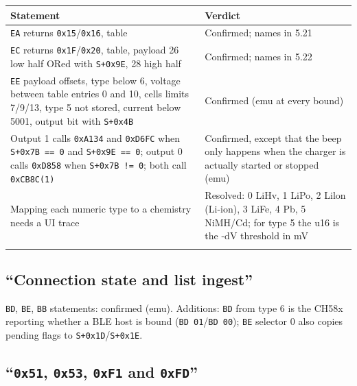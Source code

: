 {\def\LTcaptype{none} %
\begin{longtable}[]{@{}
  >{\raggedright\arraybackslash}p{}
  >{\raggedright\arraybackslash}p{}@{}}
\toprule\noalign{}
\begin{minipage}[b]{\linewidth}\raggedright
Statement
\end{minipage} & \begin{minipage}[b]{\linewidth}\raggedright
Verdict
\end{minipage} \\
\midrule\noalign{}
\endhead
\bottomrule\noalign{}
\endlastfoot
\texttt{EA} returns \texttt{0x15}/\texttt{0x16}, table & Confirmed;
names in 5.21 \\
\texttt{EC} returns \texttt{0x1F}/\texttt{0x20}, table, payload 26 low
half ORed with \texttt{S+0x9E}, 28 high half & Confirmed; names in
5.22 \\
\texttt{EE} payload offsets, type below 6, voltage between table entries
0 and 10, cells limits 7/9/13, type 5 not stored, current below 5001,
output bit with \texttt{S+0x4B} & Confirmed (emu at every bound) \\
Output 1 calls \texttt{0xA134} and \texttt{0xD6FC} when
\texttt{S+0x7B\ ==\ 0} and \texttt{S+0x9E\ ==\ 0}; output 0 calls
\texttt{0xD858} when \texttt{S+0x7B\ !=\ 0}; both call
\texttt{0xCB8C(1)} & Confirmed, except that the beep only happens when
the charger is actually started or stopped (emu) \\
Mapping each numeric type to a chemistry needs a UI trace & Resolved: 0
LiHv, 1 LiPo, 2 Lilon (Li-ion), 3 LiFe, 4 Pb, 5 NiMH/Cd; for type 5 the
u16 is the -dV threshold in mV \\*
\end{longtable}
}

\subsection{``Connection state and list
ingest''}\label{connection-state-and-list-ingest}

\texttt{BD}, \texttt{BE}, \texttt{BB} statements: confirmed (emu).
Additions: \texttt{BD} from type 6 is the CH58x reporting whether a BLE
host is bound (\texttt{BD\ 01}/\texttt{BD\ 00}); \texttt{BE} selector 0
also copies pending flags to \texttt{S+0x1D}/\texttt{S+0x1E}.

\subsection{\texorpdfstring{``\texttt{0x51}, \texttt{0x53},
\texttt{0xF1} and
\texttt{0xFD}''}{``0x51, 0x53, 0xF1 and 0xFD''}}\label{x51-0x53-0xf1-and-0xfd}

